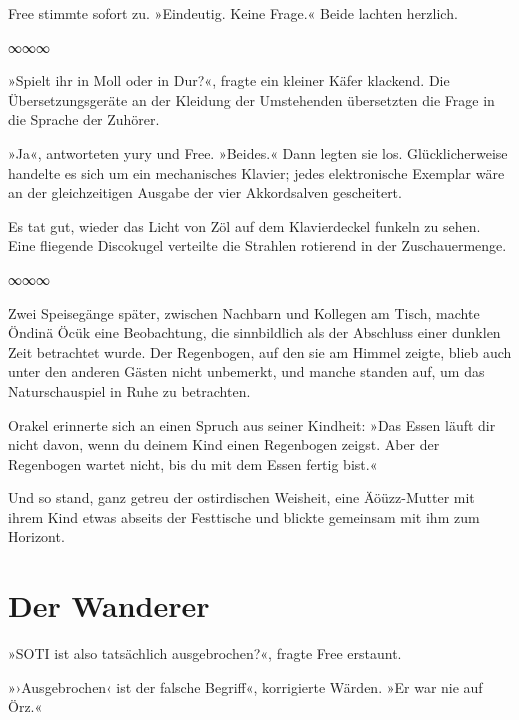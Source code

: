 Free stimmte sofort zu. »Eindeutig. Keine Frage.« Beide lachten herzlich.

\begin{center}
∞∞∞
\end{center}

»Spielt ihr in Moll oder in Dur?«, fragte ein kleiner Käfer klackend. Die Übersetzungsgeräte an der Kleidung der Umstehenden übersetzten die Frage in die Sprache der Zuhörer.

»Ja«, antworteten yury und Free. »Beides.« Dann legten sie los. Glücklicherweise handelte es sich um ein mechanisches Klavier; jedes elektronische Exemplar wäre an der gleichzeitigen Ausgabe der vier Akkordsalven gescheitert.


Es tat gut, wieder das Licht von Zöl auf dem Klavierdeckel funkeln zu sehen. Eine fliegende Discokugel verteilte die Strahlen rotierend in der Zuschauermenge.

\begin{center}
∞∞∞
\end{center}

Zwei Speisegänge später, zwischen Nachbarn und Kollegen am Tisch, machte Öndinä Öcük eine Beobachtung, die sinnbildlich als der Abschluss einer dunklen Zeit betrachtet wurde. Der Regenbogen, auf den sie am Himmel zeigte, blieb auch unter den anderen Gästen nicht unbemerkt, und manche standen auf, um das Naturschauspiel in Ruhe zu betrachten.

Orakel erinnerte sich an einen Spruch aus seiner Kindheit: »Das Essen läuft dir nicht davon, wenn du deinem Kind einen Regenbogen zeigst. Aber der Regenbogen wartet nicht, bis du mit dem Essen fertig bist.«

Und so stand, ganz getreu der ostirdischen Weisheit, eine Äöüzz-Mutter mit ihrem Kind etwas abseits der Festtische und blickte gemeinsam mit ihm zum Horizont.


\chapter{Der Wanderer}

»SOTI ist also tatsächlich ausgebrochen?«, fragte Free erstaunt.

»›Ausgebrochen‹ ist der falsche Begriff«, korrigierte Wärden. »Er war nie auf Örz.«

